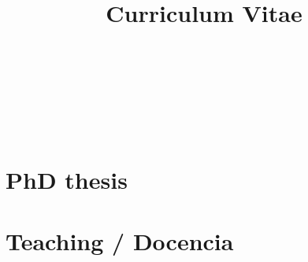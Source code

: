 \documentclass{article}
\title{Curriculum Vitae}
\author{
  \begin{tabular}{c}
      \\
    ~\\
     \\
     \\
     \\
    ~\\
     \\
    
  \end{tabular}
}
\begin{document}
\maketitle

\renewcommand{\refname}{Journal papers / Artículos en revistas}


\renewcommand{\refname}{Conference papers / Ponencias en congresos}


\renewcommand{\refname}{Books / Libros}


\renewcommand{\refname}{Book chapters / Capítulos de libro}


\renewcommand{\refname}{Projects / Proyectos}


\renewcommand{\refname}{Contracts / Contratos}


\renewcommand{\refname}{Phd thesis supervision / Supervisión de tesis}


\section*{PhD thesis}


\section*{Teaching / Docencia}


\renewcommand{\refname}{Courses / Cursos impartidos}


\renewcommand{\refname}{Final projects supervision / Supervisión de
  proyectos final de carrera}

\end{document}
